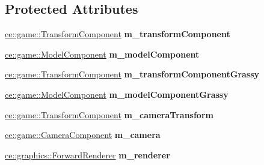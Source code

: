 \subsection*{Protected Attributes}
\begin{DoxyCompactItemize}
\item 
\mbox{\label{classce_1_1game_1_1_example_game_mode_a7a086bf963cd0f90bce90f7bf408f718}} 
\hyperlink{classce_1_1game_1_1_transform_component}{ce\+::game\+::\+Transform\+Component} {\bfseries m\+\_\+transform\+Component}
\item 
\mbox{\label{classce_1_1game_1_1_example_game_mode_a4d3e7de3f088f8e0cbb3933bf4b51eb9}} 
\hyperlink{classce_1_1game_1_1_model_component}{ce\+::game\+::\+Model\+Component} {\bfseries m\+\_\+model\+Component}
\item 
\mbox{\label{classce_1_1game_1_1_example_game_mode_afeb8258af62acab90107035f2bbbb074}} 
\hyperlink{classce_1_1game_1_1_transform_component}{ce\+::game\+::\+Transform\+Component} {\bfseries m\+\_\+transform\+Component\+Grassy}
\item 
\mbox{\label{classce_1_1game_1_1_example_game_mode_a61458c1f82c751975d11714b3a20a3b8}} 
\hyperlink{classce_1_1game_1_1_model_component}{ce\+::game\+::\+Model\+Component} {\bfseries m\+\_\+model\+Component\+Grassy}
\item 
\mbox{\label{classce_1_1game_1_1_example_game_mode_a56415cf24321a3f414242f541a97843e}} 
\hyperlink{classce_1_1game_1_1_transform_component}{ce\+::game\+::\+Transform\+Component} {\bfseries m\+\_\+camera\+Transform}
\item 
\mbox{\label{classce_1_1game_1_1_example_game_mode_a78332e850a9f6a7f7309b3226d42bd41}} 
\hyperlink{classce_1_1game_1_1_camera_component}{ce\+::game\+::\+Camera\+Component} {\bfseries m\+\_\+camera}
\item 
\mbox{\label{classce_1_1game_1_1_example_game_mode_a533941188b8d130f9ae2c91c157b18c9}} 
\hyperlink{classce_1_1graphics_1_1_forward_renderer}{ce\+::graphics\+::\+Forward\+Renderer} {\bfseries m\+\_\+renderer}

\end{DoxyCompactItemize}
